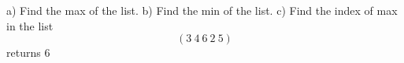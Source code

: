 a) Find the max of the list.
b) Find the min of the list.
c) Find the index of max in the list
$$(3\ 4\ 6\ 2\ 5) $$ returns  6

 \bye